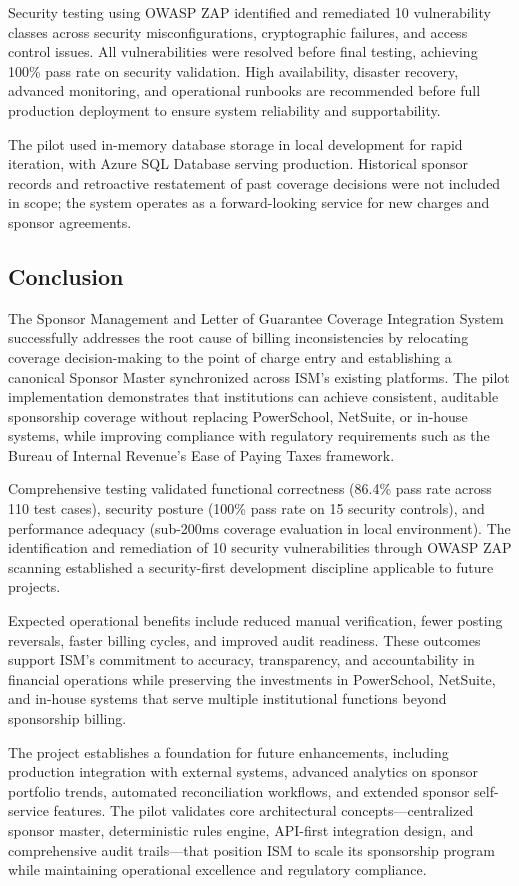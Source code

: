 Security testing using OWASP ZAP identified and remediated 10 vulnerability classes across security misconfigurations, cryptographic failures, and access control issues. All vulnerabilities were resolved before final testing, achieving 100\% pass rate on security validation. High availability, disaster recovery, advanced monitoring, and operational runbooks are recommended before full production deployment to ensure system reliability and supportability.

The pilot used in-memory database storage in local development for rapid iteration, with Azure SQL Database serving production. Historical sponsor records and retroactive restatement of past coverage decisions were not included in scope; the system operates as a forward-looking service for new charges and sponsor agreements.

\subsection{Conclusion}

The Sponsor Management and Letter of Guarantee Coverage Integration System successfully addresses the root cause of billing inconsistencies by relocating coverage decision-making to the point of charge entry and establishing a canonical Sponsor Master synchronized across ISM's existing platforms. The pilot implementation demonstrates that institutions can achieve consistent, auditable sponsorship coverage without replacing PowerSchool, NetSuite, or in-house systems, while improving compliance with regulatory requirements such as the Bureau of Internal Revenue's Ease of Paying Taxes framework.

Comprehensive testing validated functional correctness (86.4\% pass rate across 110 test cases), security posture (100\% pass rate on 15 security controls), and performance adequacy (sub-200ms coverage evaluation in local environment). The identification and remediation of 10 security vulnerabilities through OWASP ZAP scanning established a security-first development discipline applicable to future projects.

Expected operational benefits include reduced manual verification, fewer posting reversals, faster billing cycles, and improved audit readiness. These outcomes support ISM's commitment to accuracy, transparency, and accountability in financial operations while preserving the investments in PowerSchool, NetSuite, and in-house systems that serve multiple institutional functions beyond sponsorship billing.

The project establishes a foundation for future enhancements, including production integration with external systems, advanced analytics on sponsor portfolio trends, automated reconciliation workflows, and extended sponsor self-service features. The pilot validates core architectural concepts—centralized sponsor master, deterministic rules engine, API-first integration design, and comprehensive audit trails—that position ISM to scale its sponsorship program while maintaining operational excellence and regulatory compliance.
